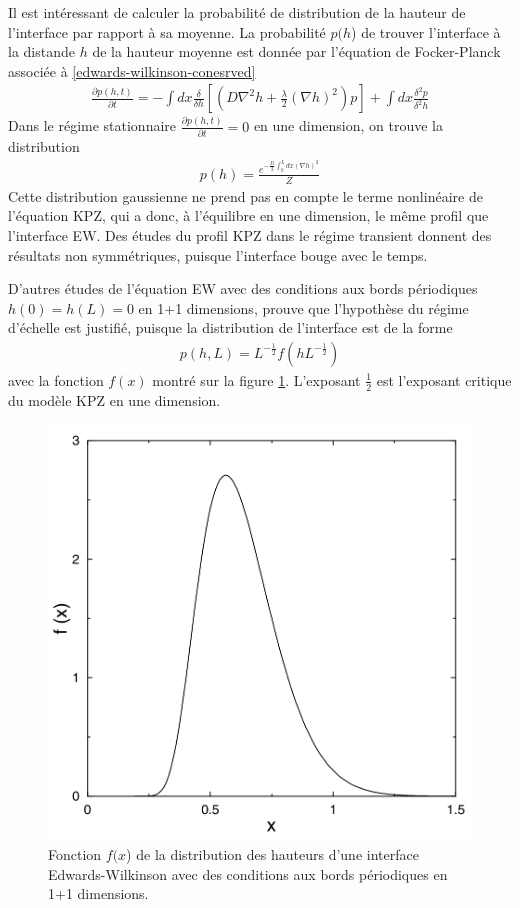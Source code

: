 Il est intéressant de calculer la probabilité de distribution de la hauteur de l'interface par rapport à sa moyenne. La probabilité $p(h$) de trouver l'interface à la distande $h$ de la hauteur moyenne est donnée par l'équation de Focker-Planck\cite[p.241]{halpin-healy_kinetic_1995} associée à \ref{edwards-wilkinson-conesrved}
\begin{align}
    \frac{\partial p(h,t)}{\partial t} = - \int dx \frac{\delta}{\delta h} \left[ \left( D \nabla^2 h + \frac{\lambda}{2} (\nabla h) ^2 \right) p \right] + \int dx \frac{\delta^2 p}{\delta^2 h}
    \label{fokker-planck}
\end{align}
Dans le régime stationnaire $ \frac{\partial p(h,t)}{\partial t} = 0$ en une dimension, on trouve la distribution
\begin{align}
    p(h) = \frac{e^{-\frac{D}{2}\int_0^L dx (\nabla h)^2}}{Z}
    \label{stationary-distribution}
\end{align}
Cette distribution gaussienne ne prend pas en compte le terme nonlinéaire de l'équation KPZ, qui a donc, à l'équilibre en une dimension, le même profil que l'interface EW. Des études du profil KPZ dans le régime transient \cite{miettinen_experimental_2005,assis_dynamic_2015,g_foltin_width_1994,antal_dynamic_1996} donnent des résultats non symmétriques, puisque l'interface bouge avec le temps.

D'autres études de l'équation EW avec des conditions aux bords périodiques $h(0)=h(L)=0$ en 1+1 dimensions, prouve que l'hypothèse du régime d'échelle est justifié\cite{majumdar_airy_2005}, puisque la distribution de l'interface est de la forme 
\begin{align}
    p(h,L) = L^{-\frac{1}{2}} f(h L^{-\frac{1}{2}} )
\end{align}
avec la fonction $f(x)$ montré sur la figure \ref{fig-airy-majumdar}. L'exposant $\frac{1}{2}$ est l'exposant critique du modèle KPZ en une dimension.
\begin{figure}
    \centering
    \includegraphics[width=0.5\linewidth]{intro/airyplot-majumdar.png}
    \caption{Fonction $f(x$) de la distribution des hauteurs d'une interface Edwards-Wilkinson avec des conditions aux bords périodiques\cite{majumdar_airy_2005} en 1+1 dimensions.}
     \label{fig-airy-majumdar}
\end{figure}


